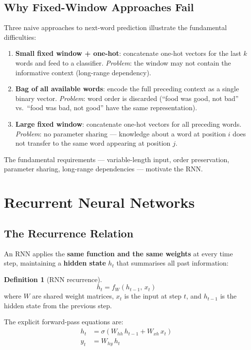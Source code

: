 \documentclass[11pt,a4paper]{article}
\theoremstyle{definition}
\newtheorem{definition}{Definition}[section]
\theoremstyle{plain}
\theoremstyle{remark}
\begin{document}
\subsection{Why Fixed-Window Approaches Fail}

Three naive approaches to next-word prediction illustrate the fundamental difficulties:

\begin{enumerate}
    \item \textbf{Small fixed window + one-hot}: concatenate one-hot vectors for the last $k$ words and feed to a classifier. \textit{Problem}: the window may not contain the informative context (long-range dependency).
    \item \textbf{Bag of all available words}: encode the full preceding context as a single binary vector. \textit{Problem}: word order is discarded (``food was good, not bad'' vs.\ ``food was bad, not good'' have the same representation).
    \item \textbf{Large fixed window}: concatenate one-hot vectors for all preceding words. \textit{Problem}: no parameter sharing --- knowledge about a word at position $i$ does not transfer to the same word appearing at position $j$.
\end{enumerate}

The fundamental requirements --- variable-length input, order preservation, parameter sharing, long-range dependencies --- motivate the RNN.


\section{Recurrent Neural Networks}

\subsection{The Recurrence Relation}

An RNN applies the \textbf{same function and the same weights} at every time step, maintaining a \textbf{hidden state} $h_t$ that summarises all past information:

\begin{definition}[RNN recurrence]
\[
    h_t = f_W(h_{t-1},\, x_t)
\]
where $W$ are shared weight matrices, $x_t$ is the input at step $t$, and $h_{t-1}$ is the hidden state from the previous step.
\end{definition}

The explicit forward-pass equations are:
\begin{align}
    h_t &= \sigma(W_{hh}\,h_{t-1} + W_{xh}\,x_t) \\
    y_t &= W_{hy}\,h_t
\end{align}
\end{document}
